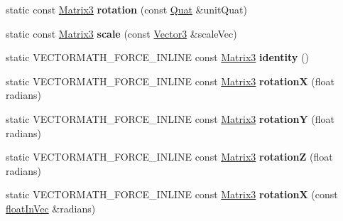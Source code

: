 \begin{DoxyCompactItemize}
static const \hyperlink{classVectormath_1_1Aos_1_1Matrix3}{Matrix3} {\bfseries rotation} (const \hyperlink{classVectormath_1_1Aos_1_1Quat}{Quat} \&unit\+Quat)
\item 
\mbox{\label{classVectormath_1_1Aos_1_1Matrix3_a8007cbbfe3a8aab7863d1c1c0c329c0f}} 
static const \hyperlink{classVectormath_1_1Aos_1_1Matrix3}{Matrix3} {\bfseries scale} (const \hyperlink{classVectormath_1_1Aos_1_1Vector3}{Vector3} \&scale\+Vec)
\item 
\mbox{\label{classVectormath_1_1Aos_1_1Matrix3_a5a53aa0cafda17380201bef508bf0273}} 
static V\+E\+C\+T\+O\+R\+M\+A\+T\+H\+\_\+\+F\+O\+R\+C\+E\+\_\+\+I\+N\+L\+I\+NE const \hyperlink{classVectormath_1_1Aos_1_1Matrix3}{Matrix3} {\bfseries identity} ()
\item 
\mbox{\label{classVectormath_1_1Aos_1_1Matrix3_ad817b69c5b99754285510719042cd479}} 
static V\+E\+C\+T\+O\+R\+M\+A\+T\+H\+\_\+\+F\+O\+R\+C\+E\+\_\+\+I\+N\+L\+I\+NE const \hyperlink{classVectormath_1_1Aos_1_1Matrix3}{Matrix3} {\bfseries rotationX} (float radians)
\item 
\mbox{\label{classVectormath_1_1Aos_1_1Matrix3_a7af8c94b47f2b8f6a00b5817bdc2ae4c}} 
static V\+E\+C\+T\+O\+R\+M\+A\+T\+H\+\_\+\+F\+O\+R\+C\+E\+\_\+\+I\+N\+L\+I\+NE const \hyperlink{classVectormath_1_1Aos_1_1Matrix3}{Matrix3} {\bfseries rotationY} (float radians)
\item 
\mbox{\label{classVectormath_1_1Aos_1_1Matrix3_aae878a22974e41c2c2b7fd9e73ec7e02}} 
static V\+E\+C\+T\+O\+R\+M\+A\+T\+H\+\_\+\+F\+O\+R\+C\+E\+\_\+\+I\+N\+L\+I\+NE const \hyperlink{classVectormath_1_1Aos_1_1Matrix3}{Matrix3} {\bfseries rotationZ} (float radians)
\item 
\mbox{\label{classVectormath_1_1Aos_1_1Matrix3_a467944d1fe5cc189a008a1069f16854e}} 
static V\+E\+C\+T\+O\+R\+M\+A\+T\+H\+\_\+\+F\+O\+R\+C\+E\+\_\+\+I\+N\+L\+I\+NE const \hyperlink{classVectormath_1_1Aos_1_1Matrix3}{Matrix3} {\bfseries rotationX} (const \hyperlink{classVectormath_1_1floatInVec}{float\+In\+Vec} \&radians)
\item 
\mbox{\label{classVectormath_1_1Aos_1_1Matrix3_a706f057e0f5b216143b16f2772ce89a7}} 

\end{DoxyCompactItemize}
